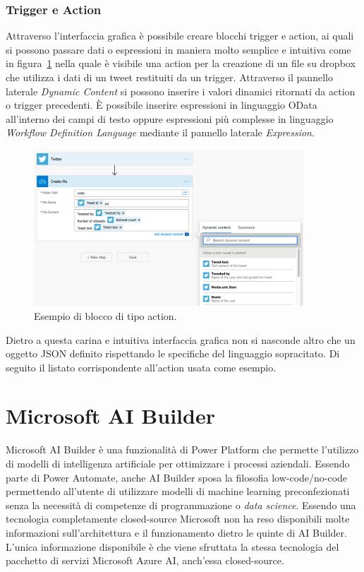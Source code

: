 \subsubsection{Trigger e Action}
Attraverso l'interfaccia grafica è possibile creare blocchi trigger e action, ai quali si possono passare dati o espressioni in maniera molto semplice e intuitiva come in figura~\ref{fig:actionExample} nella quale è visibile una action per la creazione di un file su dropbox che utilizza i dati di un tweet restituiti da un trigger. Attraverso il pannello laterale \textit{Dynamic Content} si possono inserire i valori dinamici ritornati da action o trigger precedenti. È possibile inserire espressioni in linguaggio OData all'interno dei campi di testo oppure espressioni più complesse  in linguaggio \textit{Workflow Definition Language} mediante il pannello laterale \textit{Expression}\cite{WorkflowDefinitioLanguage}.
\begin{figure}[ht]
  \centering
  \includegraphics[width=0.9\textwidth]{action-example.png}
  \caption{Esempio di blocco di tipo action.}
  \label{fig:actionExample}
\end{figure}

Dietro a questa carina e intuitiva interfaccia grafica non si nasconde altro che un oggetto JSON definito rispettando le specifiche del linguaggio sopracitato. Di seguito il listato corrispondente all'action usata come esempio.



 \section{Microsoft AI Builder}
Microsoft AI Builder è una funzionalità di Power Platform che permette l'utilizzo di modelli di intelligenza artificiale per ottimizzare i processi aziendali. Essendo parte di Power Automate, anche AI Builder sposa la filosofia low-code/no-code permettendo all'utente di utilizzare modelli di machine learning preconfezionati senza la necessità di competenze di programmazione o \textit{data science}.
Essendo una tecnologia completamente closed-source Microsoft non ha reso disponibili molte informazioni sull'architettura e il funzionamento dietro le quinte di AI Builder. L'unica informazione disponibile è che viene sfruttata la stessa tecnologia del pacchetto di servizi Microsoft Azure AI, anch'essa closed-source.


